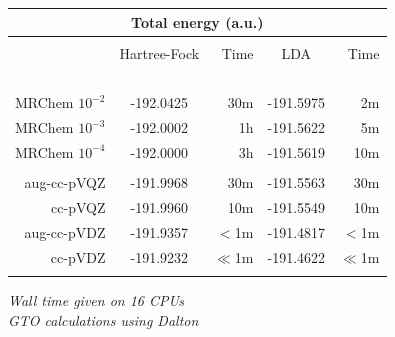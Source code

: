 \begin{frame}
\begin{table}
    \centering
    \begin{tabular}{r|cr|cr}
    \multicolumn{5}{c}{\textbf{Total energy (a.u.)}}\\
    \hline               
    \hline               
                     &               &               &               &               \\
                     &Hartree-Fock   &Time           &LDA            &Time           \\
    \hspace{20mm}\   &\hspace{20mm}\ &\hspace{05mm}\ &\hspace{20mm}\ &\hspace{05mm}\ \\
    MRChem $10^{-2}$ & -192.0425     &  30m          & -191.5975     &   2m          \\
    MRChem $10^{-3}$ & -192.0002     &   1h          & -191.5622     &   5m          \\
    MRChem $10^{-4}$ & -192.0000     &   3h          & -191.5619     &  10m          \\
                     &               &               &               &               \\
    aug-cc-pVQZ      & -191.9968     &  30m          & -191.5563     &  30m          \\
        cc-pVQZ      & -191.9960     &  10m          & -191.5549     &  10m          \\
    aug-cc-pVDZ      & -191.9357     &  $<$1m        & -191.4817     &  $<$1m        \\
        cc-pVDZ      & -191.9232     &  $\ll$1m      & -191.4622     &  $\ll$1m      \\
                     &               &               &               &               \\
    \hline
    \hline
    \end{tabular}
\end{table}

\centering
\it{Wall time given on 16 CPUs}\\
\it{GTO calculations using Dalton}

\end{frame}


